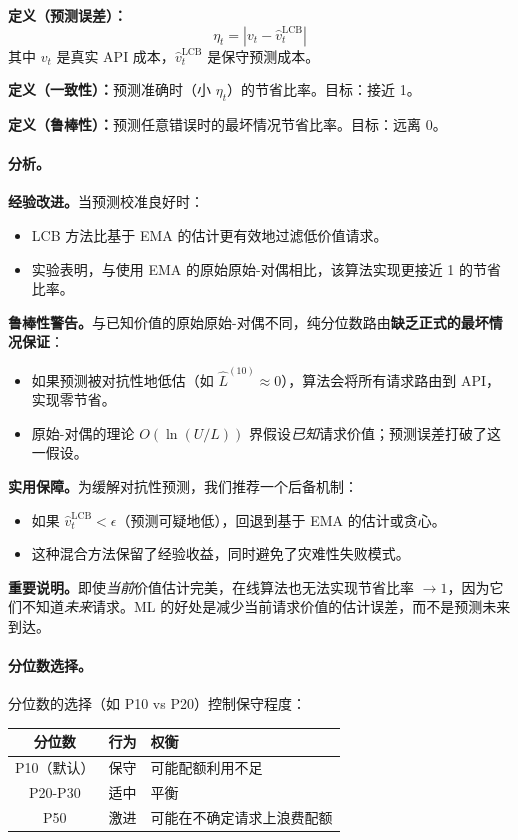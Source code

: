 \documentclass[11pt]{article}
\begin{document}
\textbf{定义（预测误差）：}
\[ \eta_t = |v_t - \hat{v}^{\text{LCB}}_t| \]
其中 $v_t$ 是真实 API 成本，$\hat{v}^{\text{LCB}}_t$ 是保守预测成本。

\textbf{定义（一致性）：}预测准确时（小 $\eta_t$）的节省比率。目标：接近 1。

\textbf{定义（鲁棒性）：}预测任意错误时的最坏情况节省比率。目标：远离 0。

\paragraph{分析。}

\textbf{经验改进。}当预测校准良好时：
\begin{itemize}
  \item LCB 方法比基于 EMA 的估计更有效地过滤低价值请求。
  \item 实验表明，与使用 EMA 的原始原始-对偶相比，该算法实现更接近 1 的节省比率。
\end{itemize}

\textbf{鲁棒性警告。}与已知价值的原始原始-对偶不同，纯分位数路由\textbf{缺乏正式的最坏情况保证}：
\begin{itemize}
  \item 如果预测被对抗性地低估（如 $\hat{L}^{(10)} \approx 0$），算法会将所有请求路由到 API，实现零节省。
  \item 原始-对偶的理论 $O(\ln(U/L))$ 界假设\emph{已知}请求价值；预测误差打破了这一假设。
\end{itemize}

\textbf{实用保障。}为缓解对抗性预测，我们推荐一个后备机制：
\begin{itemize}
  \item 如果 $\hat{v}^{\text{LCB}}_t < \epsilon$（预测可疑地低），回退到基于 EMA 的估计或贪心。
  \item 这种混合方法保留了经验收益，同时避免了灾难性失败模式。
\end{itemize}

\textbf{重要说明。}即使\emph{当前}价值估计完美，在线算法也无法实现节省比率 $\to 1$，因为它们不知道\emph{未来}请求。ML 的好处是减少当前请求价值的估计误差，而不是预测未来到达。

\paragraph{分位数选择。}
分位数的选择（如 P10 vs P20）控制保守程度：

\begin{center}
\begin{tabular}{|c|l|l|}
\hline
\textbf{分位数} & \textbf{行为} & \textbf{权衡} \\
\hline
P10（默认） & 保守 & 可能配额利用不足 \\
P20-P30 & 适中 & 平衡 \\
P50 & 激进 & 可能在不确定请求上浪费配额 \\
\hline
\end{tabular}
\end{center}
\end{document}
